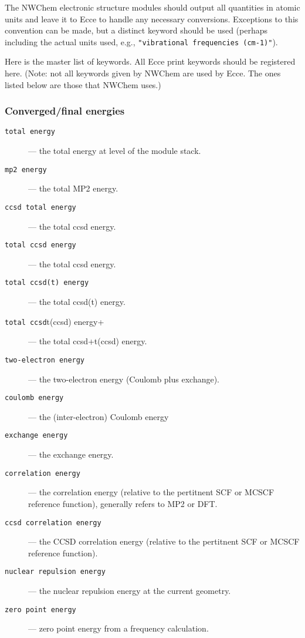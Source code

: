 The NWChem electronic structure modules should output all quantities
in atomic units and leave it to Ecce to handle any necessary
conversions.  Exceptions to this convention can be made, but a
distinct keyword should be used (perhaps including the actual units
used, e.g., \texttt{"vibrational frequencies (cm-1)"}).

Here is the master list of keywords.  All Ecce print keywords should
be registered here.  (Note: not all keywords given by NWChem are used
by Ecce.  The ones listed below are those that NWChem uses.)

\subsubsection{Converged/final energies}

\begin{description}
\item [\texttt{total energy}] --- the total energy at level of the module stack.
\item [\texttt{mp2 energy}] --- the total MP2 energy.
\item [\texttt{ccsd total energy}] --- the total ccsd energy.
\item [\texttt{total ccsd energy}] --- the total ccsd energy.
\item [\texttt{total ccsd(t) energy}] --- the total ccsd(t) energy.
\item [\texttt{total ccsd}t(ccsd) energy+] --- the total ccsd+t(ccsd) energy.
\item [\texttt{two-electron energy}] --- the two-electron energy
(Coulomb plus exchange).
\item [\texttt{coulomb energy}] --- the (inter-electron) Coulomb
  energy
\item [\texttt{exchange energy}] --- the exchange energy.
\item [\texttt{correlation energy}] --- the correlation energy
  (relative to the pertitnent SCF or MCSCF reference function), generally refers 
  to MP2 or DFT.
\item [\texttt{ccsd correlation energy}] --- the CCSD correlation energy
  (relative to the pertitnent SCF or MCSCF reference function).
\item [\texttt{nuclear repulsion energy}] --- the nuclear repulsion
  energy at the current geometry.
\item [\texttt{zero point energy}] --- zero point energy from a frequency calculation.
\end{description}

